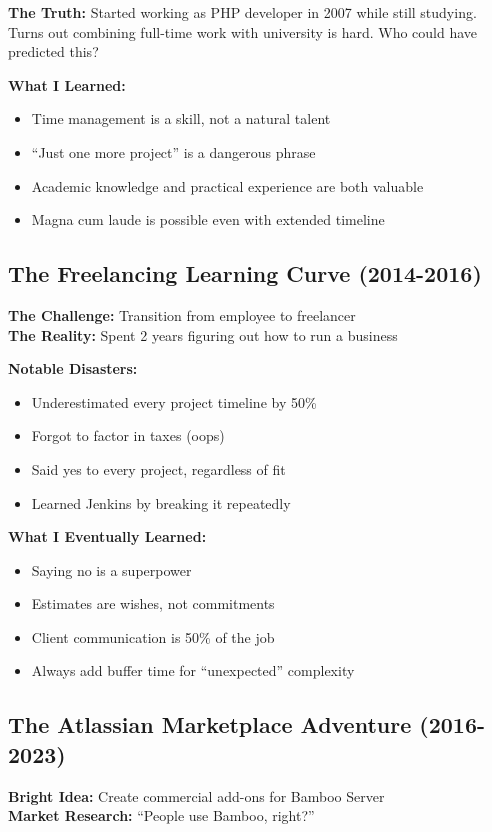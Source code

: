 \documentclass[11pt,a4paper]{article}
\begin{document}
\textbf{The Truth:} Started working as PHP developer in 2007 while still studying. Turns out combining full-time work with university is hard. Who could have predicted this?

\textbf{What I Learned:}
\begin{itemize}[leftmargin=1.5em, itemsep=0.1em]
\item Time management is a skill, not a natural talent
\item ``Just one more project'' is a dangerous phrase
\item Academic knowledge and practical experience are both valuable
\item Magna cum laude is possible even with extended timeline
\end{itemize}

\newpage

\subsection{The Freelancing Learning Curve (2014-2016)}
\textbf{The Challenge:} Transition from employee to freelancer\\
\textbf{The Reality:} Spent 2 years figuring out how to run a business

\textbf{Notable Disasters:}
\begin{itemize}[leftmargin=1.5em, itemsep=0.1em]
\item Underestimated every project timeline by 50\%
\item Forgot to factor in taxes (oops)
\item Said yes to every project, regardless of fit
\item Learned Jenkins by breaking it repeatedly
\end{itemize}

\textbf{What I Eventually Learned:}
\begin{itemize}[leftmargin=1.5em, itemsep=0.1em]
\item Saying no is a superpower
\item Estimates are wishes, not commitments
\item Client communication is 50\% of the job
\item Always add buffer time for ``unexpected'' complexity
\end{itemize}

\subsection{The Atlassian Marketplace Adventure (2016-2023)}
\textbf{Bright Idea:} Create commercial add-ons for Bamboo Server\\
\textbf{Market Research:} ``People use Bamboo, right?''
\end{document}
